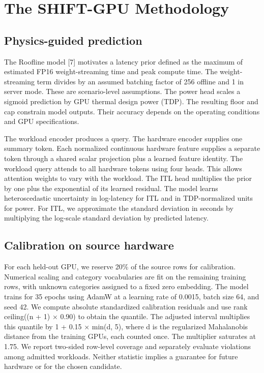 \documentclass[preprint,12pt]{elsarticle}
\begin{document}
\section{The SHIFT-GPU Methodology}\label{the-shift-gpu-methodology}

\subsection{Physics-guided
prediction}\label{physics-guided-prediction}

The Roofline model {[}7{]} motivates a latency prior defined as the
maximum of estimated FP16 weight-streaming time and peak compute time.
The weight-streaming term divides by an assumed batching factor of 256
offline and 1 in server mode. These are scenario-level assumptions. The
power head scales a sigmoid prediction by GPU thermal design power
(TDP). The resulting floor and cap constrain model outputs. Their
accuracy depends on the operating conditions and GPU specifications.

The workload encoder produces a query. The hardware encoder supplies one
summary token. Each normalized continuous hardware feature supplies a
separate token through a shared scalar projection plus a learned feature
identity. The workload query attends to all hardware tokens using four
heads. This allows attention weights to vary with the workload. The ITL
head multiplies the prior by one plus the exponential of its learned
residual. The model learns heteroscedastic uncertainty in log-latency
for ITL and in TDP-normalized units for power. For ITL, we approximate
the standard deviation in seconds by multiplying the log-scale standard
deviation by predicted latency.

\subsection{Calibration on source
hardware}\label{calibration-on-source-hardware}

For each held-out GPU, we reserve 20\% of the source rows for
calibration. Numerical scaling and category vocabularies are fit on the
remaining training rows, with unknown categories assigned to a fixed
zero embedding. The model trains for 35 epochs using AdamW at a learning
rate of 0.0015, batch size 64, and seed 42. We compute absolute
standardized calibration residuals and use rank ceiling((n + 1) × 0.90)
to obtain the quantile. The adjusted interval multiplies this quantile
by 1 + 0.15 × min(d, 5), where d is the regularized Mahalanobis distance
from the training GPUs, each counted once. The multiplier saturates at
1.75. We report two-sided row-level coverage and separately evaluate
violations among admitted workloads. Neither statistic implies a
guarantee for future hardware or for the chosen candidate.
\end{document}
